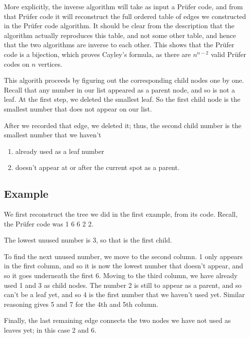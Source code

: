 \documentclass[]{article}
\providecommand{\tightlist}{%
  \setlength{\itemsep}{0pt}\setlength{\parskip}{0pt}}
\begin{document}
More explicitly, the inverse algorithm will take as input a Prüfer code,
and from that Prüfer code it will reconstruct the full ordered table of
edges we constructed in the Prüfer code algorithm. It should be clear
from the description that the algorithm actually reproduces this table,
and not some other table, and hence that the two algorithms are inverse
to each other. This shows that the Prüfer code is a bijection, which
proves Cayley's formula, as there are \(n^{n-2}\) valid Prüfer codes on
\(n\) vertices.

This algorith proceeds by figuring out the corresponding child nodes one
by one. Recall that any number in our list appeared as a parent node,
and so is not a leaf. At the first step, we deleted the smallest leaf.
So the first child node is the smallest number that does not appear on
our list.

After we recorded that edge, we deleted it; thus, the second child
number is the smallest number that we haven't

\begin{enumerate}
\def\labelenumi{\arabic{enumi}.}
\tightlist
\item
  already used as a leaf number\\
\item
  doesn't appear at or after the current spot as a parent.
\end{enumerate}

\subsection{Example}\label{example-3}

We first reconstruct the tree we did in the first example, from its
code. Recall, the Prüfer code was 1 6 6 2 2.

The lowest unused number is 3, so that is the first child.

To find the next unused number, we move to the second column. 1 only
appears in the first column, and so it is now the lowest number that
doesn't appear, and so it goes underneath the first 6. Moving to the
third column, we have already used 1 and 3 as child nodes. The number 2
is still to appear as a parent, and so can't be a leaf yet, and so 4 is
the first number that we haven't used yet. Similar reasoning gives 5 and
7 for the 4th and 5th column.

Finally, the last remaining edge connects the two nodes we have not used
as leaves yet; in this case 2 and 6.
\end{document}
